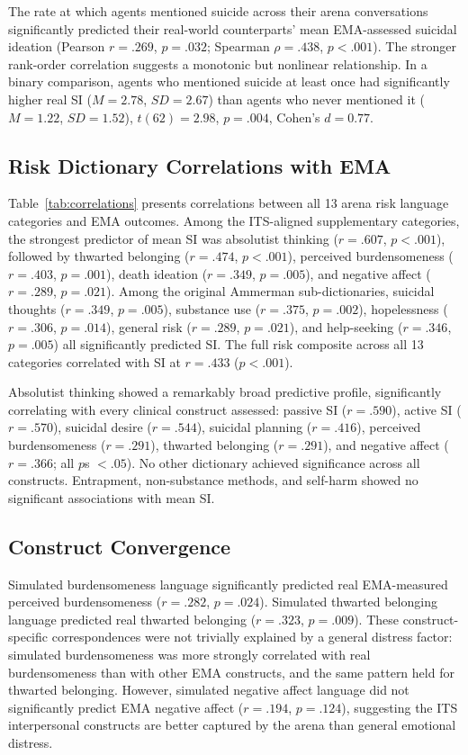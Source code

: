 \documentclass[review,12pt,authoryear]{elsarticle}
\begin{document}
The rate at which agents mentioned suicide across their arena conversations significantly predicted their real-world counterparts' mean EMA-assessed suicidal ideation (Pearson $r = .269$, $p = .032$; Spearman $\rho = .438$, $p < .001$). The stronger rank-order correlation suggests a monotonic but nonlinear relationship. In a binary comparison, agents who mentioned suicide at least once had significantly higher real SI ($M = 2.78$, $SD = 2.67$) than agents who never mentioned it ($M = 1.22$, $SD = 1.52$), $t(62) = 2.98$, $p = .004$, Cohen's $d = 0.77$.

\subsection{Risk Dictionary Correlations with EMA}

Table~\ref{tab:correlations} presents correlations between all 13 arena risk language categories and EMA outcomes. Among the ITS-aligned supplementary categories, the strongest predictor of mean SI was absolutist thinking ($r = .607$, $p < .001$), followed by thwarted belonging ($r = .474$, $p < .001$), perceived burdensomeness ($r = .403$, $p = .001$), death ideation ($r = .349$, $p = .005$), and negative affect ($r = .289$, $p = .021$). Among the original Ammerman sub-dictionaries, suicidal thoughts ($r = .349$, $p = .005$), substance use ($r = .375$, $p = .002$), hopelessness ($r = .306$, $p = .014$), general risk ($r = .289$, $p = .021$), and help-seeking ($r = .346$, $p = .005$) all significantly predicted SI. The full risk composite across all 13 categories correlated with SI at $r = .433$ ($p < .001$).

Absolutist thinking showed a remarkably broad predictive profile, significantly correlating with every clinical construct assessed: passive SI ($r = .590$), active SI ($r = .570$), suicidal desire ($r = .544$), suicidal planning ($r = .416$), perceived burdensomeness ($r = .291$), thwarted belonging ($r = .291$), and negative affect ($r = .366$; all $p$s $< .05$). No other dictionary achieved significance across all constructs. Entrapment, non-substance methods, and self-harm showed no significant associations with mean SI.

\subsection{Construct Convergence}

Simulated burdensomeness language significantly predicted real EMA-measured perceived burdensomeness ($r = .282$, $p = .024$). Simulated thwarted belonging language predicted real thwarted belonging ($r = .323$, $p = .009$). These construct-specific correspondences were not trivially explained by a general distress factor: simulated burdensomeness was more strongly correlated with real burdensomeness than with other EMA constructs, and the same pattern held for thwarted belonging. However, simulated negative affect language did not significantly predict EMA negative affect ($r = .194$, $p = .124$), suggesting the ITS interpersonal constructs are better captured by the arena than general emotional distress.
\end{document}
